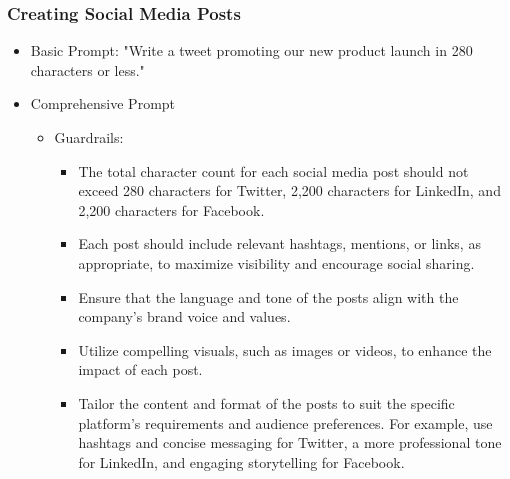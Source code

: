 \begin{frame}[fragile]\frametitle{Creating Social Media Posts}
\begin{itemize}
\item Basic Prompt: "Write a tweet promoting our new product launch in 280 characters or less."
\item Comprehensive Prompt
	\begin{itemize}
	\item Guardrails: 
		\begin{itemize}
		\item The total character count for each social media post should not exceed 280 characters for Twitter, 2,200 characters for LinkedIn, and 2,200 characters for Facebook.
		\item Each post should include relevant hashtags, mentions, or links, as appropriate, to maximize visibility and encourage social sharing.
		\item Ensure that the language and tone of the posts align with the company's brand voice and values.
		\item Utilize compelling visuals, such as images or videos, to enhance the impact of each post.
		\item Tailor the content and format of the posts to suit the specific platform's requirements and audience preferences. For example, use hashtags and concise messaging for Twitter, a more professional tone for LinkedIn, and engaging storytelling for Facebook.
		\end{itemize}	
	\end{itemize}
\end{itemize}
\end{frame}


